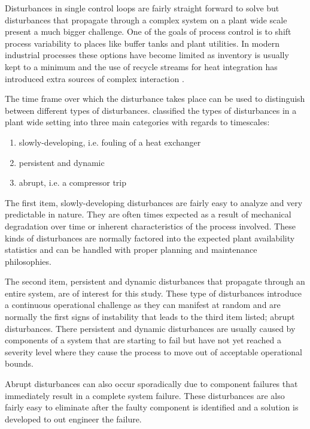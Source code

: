 Disturbances in single control loops are fairly straight forward to solve but disturbances that propagate through a complex system on a plant wide scale present a much bigger challenge. One of the goals of process control is to shift process variability to places like buffer tanks and plant utilities. In modern industrial processes these options have become limited as inventory is usually kept to a minimum and the use of recycle streams for heat integration has introduced extra sources of complex interaction \cite{thornhill2007advances}.\par

The time frame over which the disturbance takes place can be used to distinguish between different types of disturbances. \cite{thornhill2007advances} classified the types of disturbances in a plant wide setting into three main categories with regards to timescales:
\begin{enumerate}
	\item slowly-developing, i.e. fouling of a heat exchanger
	\item persistent and dynamic
	\item abrupt, i.e. a compressor trip
\end{enumerate}
The first item, slowly-developing disturbances are fairly easy to analyze and very predictable in nature. They are often times expected as a result of mechanical degradation over time or inherent characteristics of the process involved. These kinds of disturbances are normally factored into the expected plant availability statistics and can be handled with proper planning and maintenance philosophies.\par
The second item, persistent and dynamic disturbances that propagate through an entire system, are of interest for this study. These type of disturbances introduce a continuous operational challenge as they can manifest at random and are normally the first signs of instability that leads to the third item listed; abrupt disturbances. There persistent and dynamic disturbances are usually caused by components of a system that are starting to fail but have not yet reached a severity level where they cause the process to move out of acceptable operational bounds. \par
Abrupt disturbances can also occur sporadically due to component failures that immediately result in a complete system failure. These disturbances are also fairly easy to eliminate after the faulty component is identified and a solution is developed to out engineer the failure.\par  

